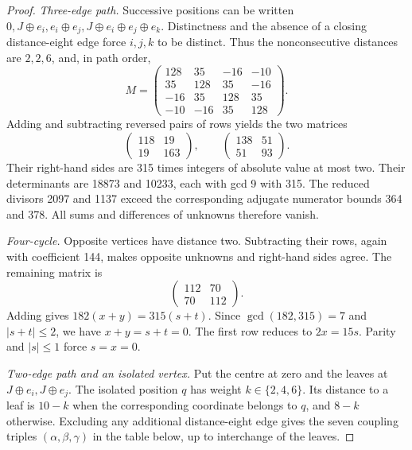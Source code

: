 \documentclass[11pt,a4paper]{article}
\theoremstyle{definition}
\theoremstyle{remark}
\begin{document}
\begin{proof}
\smallskip\noindent\emph{Three-edge path.}
Successive positions can be written
$0,J\oplus e_i,e_i\oplus e_j,J\oplus e_i\oplus e_j\oplus e_k$.
Distinctness and the absence of a closing distance-eight edge force
$i,j,k$ to be distinct. Thus the nonconsecutive distances are $2,2,6$,
and, in path order,
\[
M=\begin{pmatrix}
128&35&-16&-10\\35&128&35&-16\\
-16&35&128&35\\-10&-16&35&128
\end{pmatrix}.
\]
Adding and subtracting reversed pairs of rows yields the two matrices
\[
\begin{pmatrix}118&19\\19&163\end{pmatrix},\qquad
\begin{pmatrix}138&51\\51&93\end{pmatrix}.
\]
Their right-hand sides are 315 times integers of absolute value at
most two. Their determinants are 18873 and 10233, each with gcd 9 with
315. The reduced divisors 2097 and 1137 exceed the corresponding
adjugate numerator bounds 364 and 378. All sums and differences of
unknowns therefore vanish.

\smallskip\noindent\emph{Four-cycle.}
Opposite vertices have distance two. Subtracting their rows, again
with coefficient 144, makes opposite unknowns and right-hand sides
agree. The remaining matrix is
\[
\begin{pmatrix}112&70\\70&112\end{pmatrix}.
\]
Adding gives $182(x+y)=315(s+t)$. Since $\gcd(182,315)=7$ and
$|s+t|\le2$, we have $x+y=s+t=0$. The first row reduces to
$2x=15s$. Parity and $|s|\le1$ force $s=x=0$.

\smallskip\noindent\emph{Two-edge path and an isolated vertex.}
Put the centre at zero and the leaves at $J\oplus e_i,J\oplus e_j$.
The isolated position $q$ has weight $k\in\{2,4,6\}$. Its distance to
a leaf is $10-k$ when the corresponding coordinate belongs to $q$,
and $8-k$ otherwise. Excluding any additional distance-eight edge
gives the seven coupling triples $(\alpha,\beta,\gamma)$ in the table
below, up to interchange of the leaves.


\end{proof}
\end{document}
